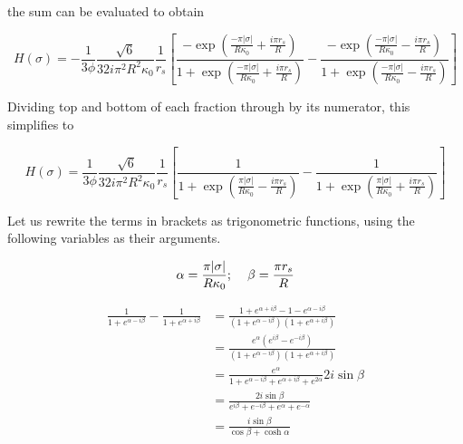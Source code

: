 \documentclass[onecolumn]{aastex63}
\begin{document}
the sum can be evaluated to obtain

\begin{equation}
    H(\sigma) = - \frac{1}{3 \phi} \frac{\sqrt{6}}{32 i \pi^2 R^2 \kappa_0} \frac{1}{r_s} \left[\frac{-\exp{\left(\frac{-\pi |\sigma|}{R\kappa_0} + \frac{i\pi r_s}{R}\right)}}{1 + \exp{\left(\frac{-\pi |\sigma|}{R\kappa_0} + \frac{i\pi r_s}{R}\right)}}-\frac{-\exp{\left(\frac{-\pi |\sigma|}{R\kappa_0} - \frac{i\pi r_s}{R}\right)}}{1 + \exp{\left(\frac{-\pi |\sigma|}{R\kappa_0} - \frac{i\pi r_s}{R}\right)}}\right]
\end{equation}

Dividing top and bottom of each fraction through by its numerator, this simplifies to

\begin{equation} \label{before_trig}
    H(\sigma) = \frac{1}{3 \phi} \frac{\sqrt{6}}{32 i \pi^2 R^2 \kappa_0} \frac{1}{r_s} \left[\frac{1}{1 + \exp{\left(\frac{\pi |\sigma|}{R\kappa_0} - \frac{i\pi r_s}{R}\right)}}-\frac{1}{1 + \exp{\left(\frac{\pi |\sigma|}{R\kappa_0} + \frac{i\pi r_s}{R}\right)}}\right]
\end{equation}

Let us rewrite the terms in brackets as trigonometric functions, using the following variables as their arguments.

\begin{equation}
    \alpha = \frac{\pi |\sigma|}{R\kappa_0}; \hspace{0.4cm} \beta = \frac{\pi r_s}{R}
\end{equation}

\begin{equation}
    \begin{split}
    \frac{1}{1+e^{\alpha - i\beta}} - \frac{1}{1+e^{\alpha + i\beta}} &= \frac{1+e^{\alpha + i\beta} - 1 - e^{\alpha - i\beta}}{\left(1+e^{\alpha - i\beta}\right)\left(1+e^{\alpha + i\beta}\right)} \\
    &= \frac{e^{\alpha}\left(e^{i\beta} - e^{- i\beta}\right)}{\left(1+e^{\alpha - i\beta}\right)\left(1+e^{\alpha + i\beta}\right)} \\
    &= \frac{e^{\alpha}}{1 + e^{\alpha - i\beta} + e^{\alpha + i\beta} + e^{2\alpha}} 2i \sin{\beta} \\
    &= \frac{2i \sin{\beta}}{e^{i\beta} + e^{- i\beta} + e^{\alpha} + e^{-\alpha}} \\
    &= \frac{i \sin{\beta}}{\cos{\beta} + \cosh{\alpha}}
    \end{split}
\end{equation}
\end{document}
